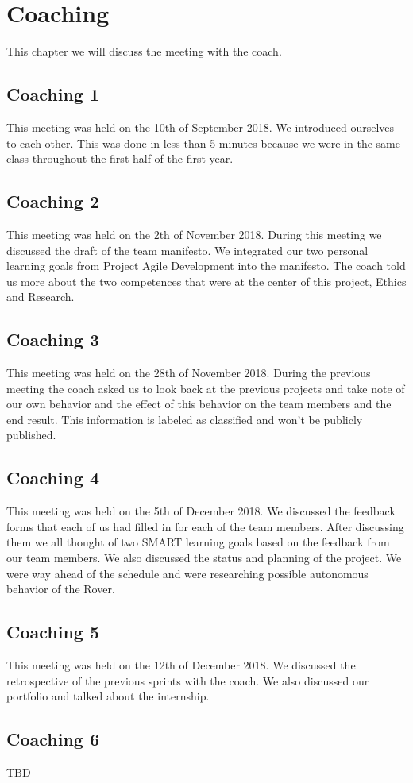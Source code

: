 \section{Coaching}
This chapter we will discuss the meeting with the coach.

\subsection{Coaching 1}
This meeting was held on the 10th of September 2018. We introduced ourselves to each other. This was done in less than 5 minutes because we were in the same class throughout the first half of the first year.

\subsection{Coaching 2}
This meeting was held on the 2th of November 2018. During this meeting we discussed the draft of the team manifesto. We integrated our two personal learning goals from Project Agile Development into the manifesto. The coach told us more about the two competences that were at the center of this project, Ethics and Research.

\subsection{Coaching 3}
This meeting was held on the 28th of November 2018. During the previous meeting the coach asked us to look back at the previous projects and take note of our own behavior and the effect of this behavior on the team members and the end result. This information is labeled as classified and won't be publicly published.

\subsection{Coaching 4}
This meeting was held on the 5th of December 2018. We discussed the feedback forms that each of us had filled in for each of the team members. After discussing them we all thought of two SMART learning goals based on the feedback from our team members. We also discussed the status and planning of the project. We were way ahead of the schedule and were researching possible autonomous behavior of the Rover.

\subsection{Coaching 5}
This meeting was held on the 12th of December 2018. We discussed the retrospective of the previous sprints with the coach. We also discussed our portfolio and talked about the internship.

\subsection{Coaching 6}
TBD

